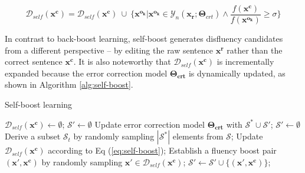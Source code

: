 \documentclass{article} %
\begin{document}
\vspace{-0.5cm}
\begin{equation}\label{eq:self-boost}
\mathcal{D}_{self}(\boldsymbol{x^c}) =  \mathcal{D}_{self}(\boldsymbol{x^c})~\cup~\{ \boldsymbol{x^{o_k}} | \boldsymbol{x^{o_k}} \in \mathcal{Y}_n(\boldsymbol{x_r};\boldsymbol{\Theta}_{crt}) \wedge \frac{f(\boldsymbol{x^{c}})}{f(\boldsymbol{x^{o_k}})} \ge \sigma  \}
\end{equation}
\vspace{-0.4cm}


In contrast to back-boost learning, self-boost generates disfluency candidates from a different perspective -- by editing the raw sentence $\boldsymbol{x^r}$ rather than the correct sentence $\boldsymbol{x^c}$. It is also noteworthy that $\mathcal{D}_{self}(\boldsymbol{x^c})$ is incrementally expanded because the error correction model $\boldsymbol{\Theta_{crt}}$ is dynamically updated,
as shown in Algorithm \ref{alg:self-boost}. %


\begin{algorithm}[h]
\centering
\caption{Self-boost learning\label{alg:self-boost}}
\begin{algorithmic}[1]
\State $\mathcal{D}_{self}(\boldsymbol{x^c}) \gets \emptyset$;
\EndFor
\State $\mathcal{S'} \gets \emptyset$
\State Update error correction model $\boldsymbol{\Theta_{crt}}$ with $\mathcal{S}^* \cup \mathcal{S'}$;
\State $\mathcal{S'} \gets \emptyset$
\State Derive a subset $\mathcal{S}_t$ by randomly sampling $|\mathcal{S}^*|$ elements from $\mathcal{S}$; 
\State Update $\mathcal{D}_{self}(\boldsymbol{x^c})$ according to Eq (\ref{eq:self-boost});
\State Establish a fluency boost pair $(\boldsymbol{x'},\boldsymbol{x^c})$ by randomly sampling $\boldsymbol{x'} \in \mathcal{D}_{self}(\boldsymbol{x^c})$;
\State $\mathcal{S'} \gets \mathcal{S'} \cup \{(\boldsymbol{x'},\boldsymbol{x^c})\}$;
\EndFor
\EndFor
\end{algorithmic}
\end{algorithm}
\end{document}
